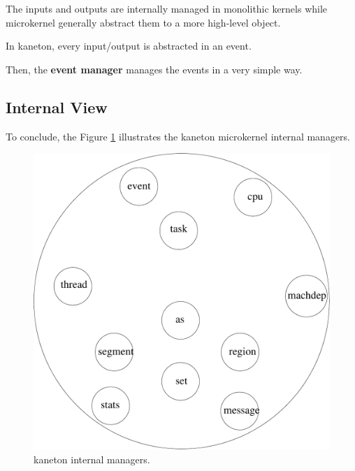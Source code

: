 The inputs and outputs are internally managed in monolithic
kernels while microkernel generally abstract them to a more high-level
object.

In kaneton, every input/output is abstracted in an event.

Then, the \textbf{event manager} manages the events in a very simple way.

%
%

\subsection{Internal View}

To conclude, the Figure \ref{figure:overview_kaneton} illustrates the kaneton
microkernel internal managers.

\begin{figure}[h]
  \begin{center}
    \includegraphics[scale=0.5]{figures/overview_kaneton.pdf}
    \caption{kaneton internal managers.}
    \label{figure:overview_kaneton}
  \end{center}
\end{figure}
